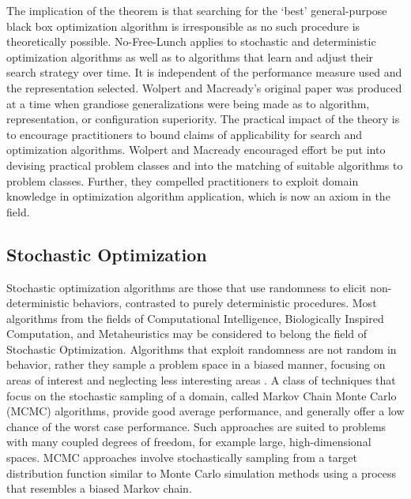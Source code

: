 \begin{bibunit}
The implication of the theorem is that searching for the `best' general-purpose black box optimization algorithm is irresponsible as no such procedure is theoretically possible. No-Free-Lunch applies to stochastic and deterministic optimization algorithms as well as to algorithms that learn and adjust their search strategy over time. It is independent of the performance measure used and the representation selected. 
Wolpert and Macready's original paper was produced at a time when grandiose generalizations were being made as to algorithm, representation, or configuration superiority. The practical impact of the theory is to encourage practitioners to bound claims of applicability for search and optimization algorithms. Wolpert and Macready encouraged effort be put into devising practical problem classes and into the matching of suitable algorithms to problem classes. Further, they compelled practitioners to exploit domain knowledge in optimization algorithm application, which is now an axiom in the field.

% 
% 
\subsection{Stochastic Optimization}
\label{subsec:stochastic}
Stochastic optimization algorithms are those that use randomness to elicit non-deterministic behaviors, contrasted to purely deterministic procedures. 
Most algorithms from the fields of Computational Intelligence, Biologically Inspired Computation, and Metaheuristics may be considered to belong the field of Stochastic Optimization. Algorithms that exploit randomness are not random in behavior, rather they sample a problem space in a biased manner, focusing on areas of interest and neglecting less interesting areas \cite{Spall2003}. 
A class of techniques that focus on the stochastic sampling of a domain, called Markov Chain Monte Carlo (MCMC) algorithms, provide good average performance, and generally offer a low chance of the worst case performance. Such approaches are suited to problems with many coupled degrees of freedom, for example large, high-dimensional spaces. MCMC approaches involve stochastically sampling from a target distribution function similar to Monte Carlo simulation methods using a process that resembles a biased Markov chain.


\end{bibunit}
